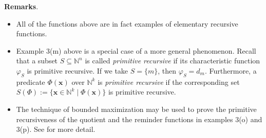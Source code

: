 \documentclass[12pt]{article}
\begin{document}
\textbf{Remarks}.  
\begin{itemize}
\item All of the functions above are in fact examples of elementary recursive functions.
\item Example 3(m) above is a special case of a more general phenomenon.  Recall that a subset $S\subseteq \mathbb{N}^n$ is called \emph{primitive recursive} if its characteristic function $\varphi_S$ is primitive recursive.  If we take $S=\lbrace m\rbrace$, then $\varphi_S=d_m$.  Furthermore, a predicate $\Phi(\boldsymbol{x})$ over $\mathbb{N}^k$ is \emph{primitive recursive} if the corresponding set $S(\Phi):=\lbrace \boldsymbol{x}\in \mathbb{N}^k \mid \Phi(\boldsymbol{x})\rbrace$ is primitive recursive.
\item The technique of bounded maximization may be used to prove the primitive recursiveness of the quotient and the reminder functions in examples 3(o) and 3(p).  See  for more detail.
\end{itemize}
\end{document}
